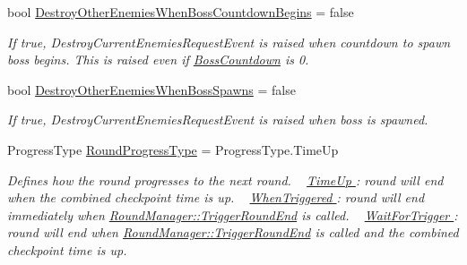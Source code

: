 \begin{DoxyCompactItemize}
bool \hyperlink{class_round_manager_1_1_round_acf766221ab1b301a493e1702acb5ef6a}{Destroy\+Other\+Enemies\+When\+Boss\+Countdown\+Begins} = false
\begin{DoxyCompactList}\small\item\em If true, Destroy\+Current\+Enemies\+Request\+Event is raised when countdown to spawn boss begins. This is raised even if \hyperlink{class_round_manager_1_1_round_a468cf0f58dd938b9c1f327f55313e71a}{Boss\+Countdown} is 0. \end{DoxyCompactList}\item 
bool \hyperlink{class_round_manager_1_1_round_a3efd4fcc0924c9b469d2cc96f1f418cd}{Destroy\+Other\+Enemies\+When\+Boss\+Spawns} = false
\begin{DoxyCompactList}\small\item\em If true, Destroy\+Current\+Enemies\+Request\+Event is raised when boss is spawned. \end{DoxyCompactList}\item 
Progress\+Type \hyperlink{class_round_manager_1_1_round_aabbe6a40e81051469e5ca8eefd18303f}{Round\+Progress\+Type} = Progress\+Type.\+Time\+Up
\begin{DoxyCompactList}\small\item\em Defines how the round progresses to the next round. ~\newline
\hyperlink{}{Time\+Up }\+: round will end when the combined checkpoint time is up. ~\newline
\hyperlink{}{When\+Triggered }\+: round will end immediately when \hyperlink{class_round_manager_1_1_trigger_round_end}{Round\+Manager\+::\+Trigger\+Round\+End} is called. ~\newline
\hyperlink{}{Wait\+For\+Trigger }\+: round will end when \hyperlink{class_round_manager_1_1_trigger_round_end}{Round\+Manager\+::\+Trigger\+Round\+End} is called and the combined checkpoint time is up. \end{DoxyCompactList}\end{DoxyCompactItemize}
